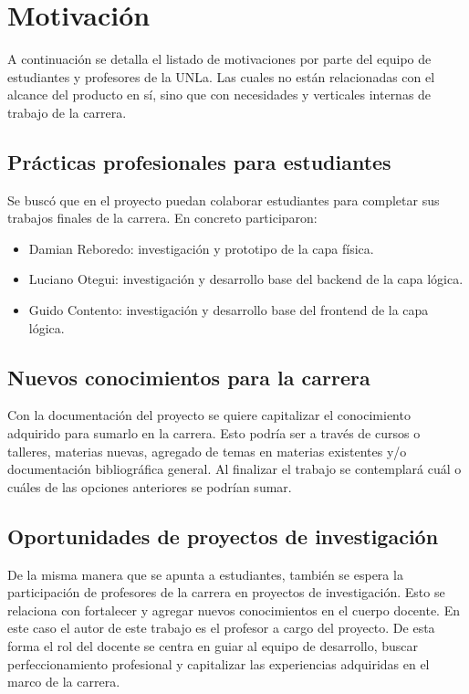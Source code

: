 
\section{Motivación}
A continuación se detalla el listado de motivaciones por parte del equipo de estudiantes y profesores de la UNLa. Las cuales no están relacionadas con el alcance del producto en sí, sino que con necesidades y verticales internas de trabajo de la carrera. 

\subsection{Prácticas profesionales para estudiantes}
Se buscó que en el proyecto puedan colaborar estudiantes para completar sus trabajos finales de la carrera. En concreto participaron:
\begin{itemize}
\item Damian Reboredo: investigación y prototipo de la capa física.
\item Luciano Otegui: investigación y desarrollo base del backend de la capa lógica.
\item Guido Contento: investigación y desarrollo base del frontend de la capa lógica.
\end{itemize}

\subsection{Nuevos conocimientos para la carrera}
Con la documentación del proyecto se quiere capitalizar el conocimiento adquirido para sumarlo en la carrera. Esto podría ser a través de cursos o talleres, materias nuevas, agregado de temas en materias existentes y/o documentación bibliográfica general. Al finalizar el trabajo se contemplará cuál o cuáles de las opciones anteriores se podrían sumar.

\subsection{Oportunidades de proyectos de investigación}
De la misma manera que se apunta a estudiantes, también se espera la participación de profesores de la carrera en proyectos de investigación. Esto se relaciona con fortalecer y agregar nuevos conocimientos en el cuerpo docente. En este caso el autor de este trabajo es el profesor a cargo del proyecto. De esta forma el rol del docente se centra en guiar al equipo de desarrollo, buscar perfeccionamiento profesional y capitalizar las experiencias adquiridas en el marco de la carrera.

